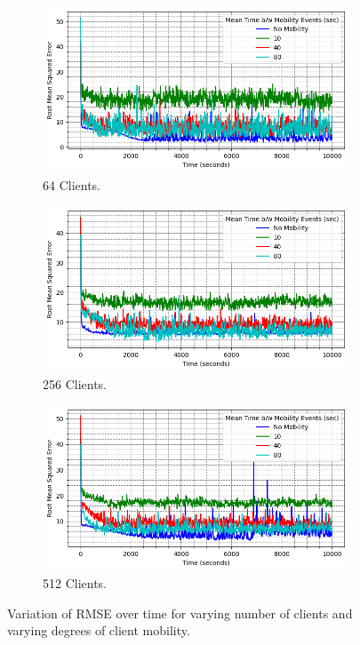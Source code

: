 \begin{figure}
\centering
\begin{subfigure}{0.48\textwidth}
  \centering
  \includegraphics[width=\linewidth]{figures/design_space/nw_prox/rmsre_vs_time_num_agents_64.png}
  \caption{64 Clients.}
  \label{fig:mobility_N_64}
\end{subfigure}
\begin{subfigure}{0.48\textwidth}
  \centering
  \includegraphics[width=\linewidth]{figures/design_space/nw_prox/rmsre_vs_time_num_agents_256.png}
  \caption{256 Clients.}
  \label{fig:mobility_N_256}
\end{subfigure}
\begin{subfigure}{0.48\textwidth}
  \centering
  \includegraphics[width=\linewidth]{figures/design_space/nw_prox/rmsre_vs_time_num_agents_512.png}
  \caption{512 Clients.}
  \label{fig:mobility_N_512}
\end{subfigure}
\label{fig:mobility_nc_rmse}
\caption{Variation of RMSE over time for varying number of clients and varying degrees of client mobility.}
\end{figure}
